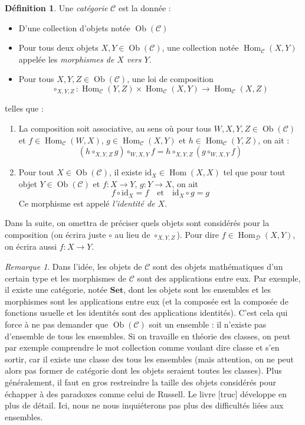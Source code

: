 \documentclass{article}
\newcommand{\id}{\mathrm{id}}
\newcommand{\cat}{\mathcal{C}}
\newcommand{\catt}{\mathcal{D}}
\newcommand{\Set}{\mathbf{Set}}
\DeclareMathOperator{\Ob}{Ob}
\DeclareMathOperator{\Hom}{Hom}
\theoremstyle{plain}
\theoremstyle{definition}
\newtheorem{definition}[theorem]{Définition}
\theoremstyle{remark}
\newtheorem*{remark}{Remarque}
\begin{document}
\begin{definition}
    Une \emph{catégorie} $\cat$ est la donnée :
    \begin{itemize}
        \item D'une collection d'objets notée $\Ob(\cat)$
        \item Pour tous deux objets $X,Y \in \Ob(\cat)$, une collection notée $\Hom_\cat (X,Y)$ appelée les \emph{morphismes de $X$ vers $Y$}.
        \item Pour tous $X,Y,Z \in \Ob(\cat)$, une loi de composition
        \[\circ_{X,Y,Z} : \Hom_\cat (Y,Z) \times \Hom_\cat (X,Y) \to \Hom_\cat (X,Z)\]
    \end{itemize}
    telles que :
    \begin{enumerate}
        \item La composition soit associative, au sens où pour tous $W,X,Y,Z \in \Ob(\cat)$ et $f \in \Hom_\cat (W,X)$, $g \in \Hom_\cat(X,Y)$ et $h \in \Hom_\cat(Y,Z)$, on ait :
        \[(h \circ_{X,Y,Z} g) \circ_{W,X,Y} f = h \circ_{X,Y,Z} (g \circ_{W,X,Y} f)\]
        \item Pour tout $X \in \Ob(\cat)$, il existe $\id_X \in \Hom(X,X)$ tel que pour tout objet $Y\in \Ob(\cat)$ et $f : X \to Y$, $g : Y\to X$, on ait
        \[f\circ \id_X = f \quad\text{et}\quad \id_X \circ g = g\]
        Ce morphisme est appelé \emph{l'identité de $X$}.
    \end{enumerate}
    Dans la suite, on omettra de préciser quels objets sont considérés pour la composition (on écrira juste $\circ$ au lieu de $\circ_{X,Y,Z}$). Pour dire $f \in \Hom_\catt (X,Y)$, on écrira aussi $f : X\to Y$.
\end{definition}

\begin{remark}
    Dans l'idée, les objets de $\cat$ sont des objets mathématiques d'un certain type et les morphismes de $\cat$ sont des applications entre eux. Par exemple, il existe une catégorie, notée $\Set$, dont les objets sont les ensembles et les morphismes sont les applications entre eux (et la composée est la composée de fonctions usuelle et les identités sont des applications identités). C'est cela qui force à ne pas demander que $\Ob(\cat)$ soit un ensemble : il n'existe pas d'ensemble de tous les ensembles. Si on travaille en théorie des classes, on peut par exemple comprendre le mot \og collection \fg comme voulant dire \og classe \fg et s'en sortir, car il existe une classe des tous les ensembles (mais attention, on ne peut alors pas former de catégorie dont les objets seraient toutes les classes). Plus généralement, il faut en gros restreindre la taille des objets considérés pour échapper à des paradoxes comme celui de Russell. Le livre [truc] développe en plus de détail. Ici, nous ne nous inquiéterons pas plus des difficultés liées aux ensembles.
\end{remark}
\end{document}
